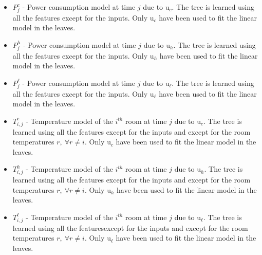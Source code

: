 \begin{itemize}[leftmargin=0.5cm]
	\item $P_j^c$ - Power consumption model at time $j$ due to $\mathrm{u}_c$. The tree is learned using all the features except for the inputs. Only $\mathrm{u}_c$ have been used to fit the linear model in the leaves.
	\item $P_j^h$ - Power consumption model at time $j$ due to $\mathrm{u}_h$. The tree is learned using all the features except for the inputs. Only $\mathrm{u}_h$ have been used to fit the linear model in the leaves.
	\item $P_j^\ell$ - Power consumption model at time $j$ due to $\mathrm{u}_\ell$. The tree is learned using all the features except for the inputs. Only $\mathrm{u}_\ell$ have been used to fit the linear model in the leaves.
	\item $T_{i,j}^c$ - Temperature model of the $i^{th}$ room at time $j$ due to $\mathrm{u}_c$. The tree is learned using all the features except for the inputs and except for the room temperatures $r,\ \forall r\neq i$. Only $\mathrm{u}_c$ have been used to fit the linear model in the leaves.
	\item $T_{i,j}^h$ - Temperature model of the $i^{th}$ room at time $j$ due to $\mathrm{u}_h$. The tree is learned using all the features except for the inputs and except for the room temperatures $r,\ \forall r\neq i$. Only $\mathrm{u}_h$ have been used to fit the linear model in the leaves.
	\item $T_{i,j}^\ell$ - Temperature model of the $i^{th}$ room at time $j$ due to $\mathrm{u}_\ell$. The tree is learned using all the featuresexcept for the inputs and except for the room temperatures $r,\ \forall r\neq i$. Only $\mathrm{u}_\ell$ have been used to fit the linear model in the leaves.
\end{itemize}

